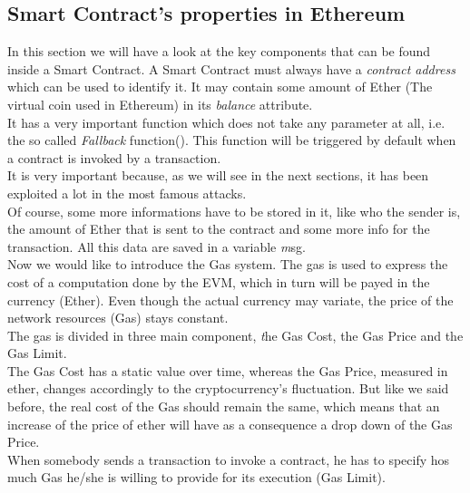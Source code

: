 \subsection{Smart Contract's properties in Ethereum}
In this section we will have a look at the key components that can be found inside a Smart Contract.
A Smart Contract must always have a {\itshape contract address} 
which can be used to identify it. It may contain some amount of Ether (The virtual coin used in Ethereum) in its {\itshape balance} attribute.
\\It has a very important function which does not take any parameter at all, i.e. the so called {\itshape Fallback} function(). This function will be triggered by default when a contract is invoked by a transaction.
\\It is very important because, as we will see in the next sections, it has been exploited a lot in the most famous attacks.
\\Of course, some more informations have to be stored in it, like who the sender is, the amount of Ether that is sent to the contract and some more info for the transaction. All this data are saved in a variable {\textit msg.}
\\Now we would like to introduce the Gas system. The gas is used to express the cost of a computation done by the EVM, which in turn will be payed in the currency (Ether). Even though the actual currency may variate, the price of the network resources (Gas) stays constant.
\\The gas is divided in three main component, {\textit the Gas Cost, the Gas Price and the Gas Limit.}
\\The Gas Cost has a static value over time, whereas the Gas Price, measured in ether, changes accordingly to the cryptocurrency's fluctuation. But like we said before, the real cost of the Gas should remain the same, which means that an increase of the price of ether will have as a consequence a drop down of the Gas Price.
\\When somebody sends a transaction to invoke a contract, he has to specify hos much Gas he/she is willing to provide for its execution (Gas Limit). 





